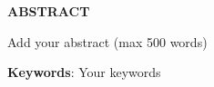 \thispagestyle{plain}
\begin{center}
    \Large \bfseries  {ABSTRACT} \\[1cm]
\end{center}

\vspace{2\baselineskip}

\noindent
Add your abstract (max 500 words)

\vspace{2\baselineskip}

\noindent
\textbf{Keywords}: Your keywords